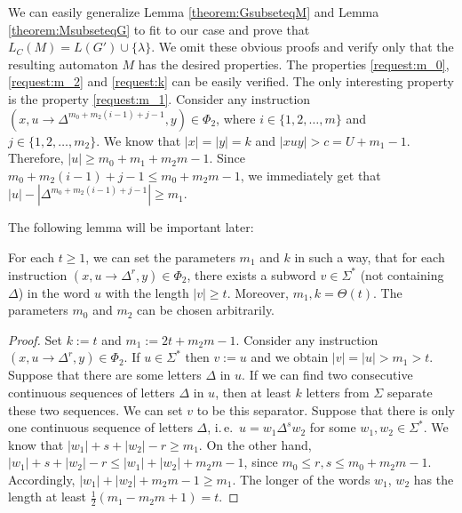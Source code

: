 We can easily generalize Lemma \ref{theorem:GsubseteqM} and Lemma \ref{theorem:MsubseteqG} to fit to our case and prove that $L_C(M) = L(G') \cup \{ \lambda \}$. We omit these obvious proofs and verify only that the resulting automaton $M$ has the desired properties. The properties \ref{request:m_0}, \ref{request:m_2} and \ref{request:k} can be easily verified. The only interesting property is the property \ref{request:m_1}. Consider any instruction $(x, u \to \Delta^{m_0 + m_2 (i - 1) + j - 1}, y) \in \Phi_2$, where $i \in \{1, 2, \ldots, m\}$ and $j \in \{1, 2, \ldots, m_2\}$. We know that $|x| = |y| = k$ and $|xuy| > c = U + m_1 - 1$. Therefore, $|u| \ge m_0 + m_1 + m_2 m - 1$. Since $m_0 + m_2 (i - 1) + j - 1 \le m_0 + m_2 m - 1$, we immediately get that $|u| - |\Delta^{m_0 + m_2 (i - 1) + j - 1}| \ge m_1$.

The following lemma will be important later:

\begin{lemma}\label{lemma:dxclra_t}
For each $t \ge 1$, we can set the parameters $m_1$ and $k$ in such a way, that for each instruction $(x, u \to \Delta^r, y) \in \Phi_2$, there exists a subword $v \in \Sigma^*$ (not containing $\Delta$) in the word $u$ with the length $|v| \ge t$. Moreover, $m_1, k = \Theta(t)$. The parameters $m_0$ and $m_2$ can be chosen arbitrarily.
\end{lemma}

\begin{proof}
Set $k := t$ and $m_1 := 2 t + m_2 m - 1$. Consider any instruction $(x, u \to \Delta^r, y) \in \Phi_2$. If $u \in \Sigma^*$ then $v := u$ and we obtain $|v| = |u| > m_1 > t$. Suppose that there are some letters $\Delta$ in $u$. If we can find two consecutive continuous sequences of letters $\Delta$ in $u$, then at least $k$ letters from $\Sigma$ separate these two sequences. We can set $v$ to be this separator. Suppose that there is only one continuous sequence of letters $\Delta$, i.\,e.\ $u = w_1 \Delta^s w_2$ for some $w_1, w_2 \in \Sigma^*$. We know that $|w_1| + s + |w_2| - r \ge m_1$. On the other hand, $|w_1| + s + |w_2| - r \le |w_1| + |w_2| + m_2 m - 1$, since $m_0 \le r, s \le m_0 + m_2 m - 1$. Accordingly, $|w_1| + |w_2| + m_2 m - 1 \ge m_1$. The longer of the words $w_1$, $w_2$ has the length at least $\frac{1}{2}(m_1 - m_2 m + 1) = t$.
\end{proof}

